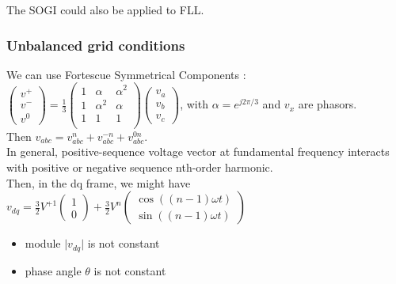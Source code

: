 \documentclass[../main.tex]{subfiles}
\begin{document}
The SOGI could also be applied to FLL.\\

\subsubsection{Unbalanced grid conditions}
We can use Fortescue Symmetrical Components : $\begin{pmatrix}
    v^+\\ v^- \\ v^0
\end{pmatrix} = \frac{1}{3} \begin{pmatrix}
    1 & \alpha & \alpha^2\\
    1 & \alpha^2 & \alpha\\
    1 & 1 & 1\\
\end{pmatrix} \begin{pmatrix}
    v_a\\ v_b\\ v_c
\end{pmatrix}$, with $\alpha = e^{j2\pi/3}$ and $v_x$ are phasors.\\
Then $v_{abc} = v_{abc}^n + v_{abc}^{-n} + v_{abc}^{0n}$.\\
In general, positive-sequence voltage vector at fundamental frequency interacts with positive or negative sequence nth-order harmonic.\\
Then, in the dq frame, we might have $v_{dq} = \frac{3}{2} V^{+1} \begin{pmatrix}
    1\\0
\end{pmatrix} + \frac{3}{2} V^n \begin{pmatrix}
    \cos((n-1) \omega t)\\
    \sin((n-1) \omega t)
\end{pmatrix}$\\
\begin{itemize}
    \item module $\lvert v_{dq} \rvert$ is not constant
    \item phase angle $\theta$ is not constant
\end{itemize}
\end{document}
